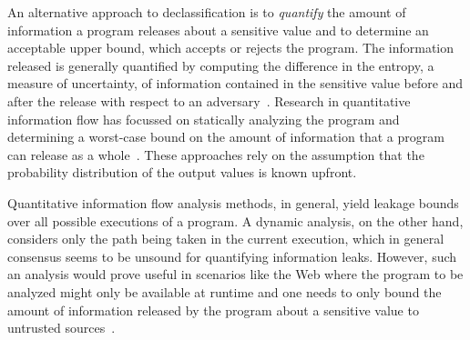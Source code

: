 
An alternative approach to declassification is to \emph{quantify} the
amount of information a program releases about a sensitive value and
to determine an acceptable upper bound, which accepts or rejects the
program. The information released is generally quantified by computing
the difference in the entropy, a measure of uncertainty, of
information contained in the sensitive value before and after the
release with respect to an adversary~. Research in quantitative
information flow has focussed on statically analyzing the program
and determining a worst-case bound on the amount of information that a
program can release as a whole~. These approaches rely on the assumption
that the probability distribution of the output values is known 
upfront. 

Quantitative information flow analysis methods, in general, yield
leakage bounds over all possible executions of a program. A dynamic
analysis, on the other hand, considers only the path being taken in
the current execution, which in general consensus seems to be unsound
for quantifying information leaks. However, such an analysis would prove
useful in scenarios like the Web where the program to be analyzed
might only be available at runtime and one needs to only bound the
amount of information released by the program about a sensitive value
to untrusted sources~. 

